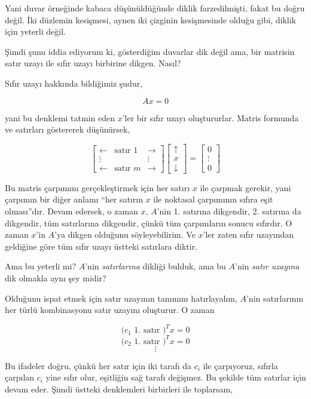 \documentclass[12pt,fleqn]{article}\usepackage{../../common}
\begin{document}
Yani duvar örneğinde kabaca düşünüldüğünde diklik farzedilmişti, fakat bu
doğru değil. İki düzlemin kesişmesi, aynen iki çizginin kesişmesinde olduğu
gibi, diklik için yeterli değil. 

Şimdi şunu iddia ediyorum ki, gösterdiğim duvarlar dik değil ama, bir matrisin
satır uzayı ile sıfır uzayı birbirine dikgen. Nasıl?

Sıfır uzayı hakkında bildiğimiz şudur, 

$$ Ax = 0 $$

yani bu denklemi tatmin eden $x$'ler bir sıfır uzayı oluştururlar. Matris
formunda ve satırları göstererek düşünürsek,

$$ 
\left[\begin{array}{ccc}
\leftarrow & \textrm{satır } 1 & \rightarrow \\
\vdots & & \vdots \\
\leftarrow & \textrm{satır } m  & \rightarrow 
\end{array}\right]
\left[\begin{array}{r}
\uparrow \\
x \\
\downarrow
\end{array}\right] 
=
\left[\begin{array}{r}
0 \\
\vdots \\
0 
\end{array}\right] 
 $$

Bu matris çarpımını gerçekleştirmek için her satırı $x$ ile çarpmak gerekir,
yani çarpımın bir diğer anlamı ``her satırın $x$ ile noktasal çarpımının sıfıra
eşit olması''dır. Devam edersek, o zaman $x$, $A$'nin 1. satırına dikgendir,
2. satırına da dikgendir, tüm satırlarına dikgendir, çünkü tüm çarpımların
sonucu sıfırdır. O zaman $x$'in $A$'ya dikgen olduğunu söyleyebilirim. Ve
$x$'ler zaten sıfır uzayından geldiğine göre tüm sıfır uzayı üstteki satırlara
diktir.

Ama bu yeterli mi? $A$'nin {\em satırlarına} dikliği bulduk, ama bu $A$'nin
{\em satır uzayına} dik olmakla aynı şey midir? 

Olduğunu ispat etmek için satır uzayının tanımını hatırlayalım, $A$'nin
satırlarının her türlü kombinasyonu satır uzayını oluşturur. O zaman

$$  \big( c_1 \textrm{ 1. satır } \big)^T x = 0 $$
$$  \big( c_2 \textrm{ 1. satır } \big)^T x = 0 $$
$$ \vdots $$

Bu ifadeler doğru, çünkü her satır için iki tarafı da $c_i$ ile çarpıyoruz,
sıfırla çarpılan $c_i$ yine sıfır olur, eşitliğin sağ tarafı değişmez. Bu
şekilde tüm satırlar için devam eder. Şimdi üstteki denklemleri birbirleri ile
toplarsam,
\end{document}
